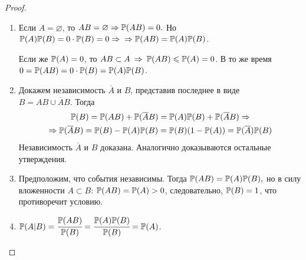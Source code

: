 \begin{proof}
\begin{enumerate} 
    \item 
        Если $A = \varnothing$, то $AB = \varnothing \Rightarrow {\mathbb{P}(AB)} = 0.$ Но $ {\mathbb{P}(A)}{\mathbb{P}(B)} = 0 \cdot {\mathbb{P}(B)} = 0 \Rightarrow \\
        \Rightarrow {\mathbb{P}(AB)} = {\mathbb{P}(A)} {\mathbb{P}(B)}$.
        
        Если же ${{\mathbb{P}(A)} = 0}$, то ${AB \subset A \: \Rightarrow \: \mathbb{P}(AB) \leqslant {\mathbb{P}(A)} = 0}$. 
        В то же время ${0 = {\mathbb{P}(AB)} = 0 \cdot {\mathbb{P}(B)} = {\mathbb{P}(A)} {\mathbb{P}(B)}}$.
    \item 
        Докажем независимость $\overline{A}$ и $B$, представив последнее в виде \\
        $B = AB \cup \overline{A}B$. Тогда
        \begin{multline*}
            {\mathbb{P}(B)} = {\mathbb{P}(AB)} + {\mathbb{P}(\overline{A}B)} = {\mathbb{P}(A)}{\mathbb{P}(B)} + {\mathbb{P}(\overline{A}B)} \Rightarrow \\
            \Rightarrow {\mathbb{P}(\overline{A}B)} = {\mathbb{P}(B)} - {\mathbb{P}(A)}{\mathbb{P}(B)} = {\mathbb{P}(B)} (1 - {\mathbb{P}(A)}) = {\mathbb{P}(\overline{A})}{\mathbb{P}(B)}
        \end{multline*}
        Независимость $\overline{A}$ и $B$ доказана. 
        Аналогично доказываются остальные утверждения.
    \item 
        Предположим, что события независимы. 
        Тогда ${\mathbb{P}(AB)} = {\mathbb{P}(A)}{\mathbb{P}(B)},$ но в силу вложенности $A \subset B$: ${\mathbb{P}(AB)} = {\mathbb{P}(A)} > 0$, следовательно, ${\mathbb{P}(B)} = 1$, что противоречит условию.
    \item 
        ${\mathbb{P}(A | B)} = \cfrac{{\mathbb{P}(AB)}}{{\mathbb{P}(B)}} = \cfrac{{\mathbb{P}(A)}{\mathbb{P}(B)}}{{\mathbb{P}(B)}} = {\mathbb{P}(A)}$.
\end{enumerate}
\end{proof}

